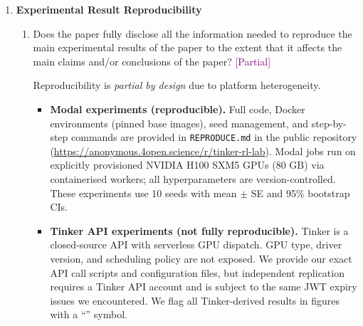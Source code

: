 \documentclass{article}
\newcommand{\answerPartial}[1][]{\textcolor{purple}{[Partial] #1}}
\begin{document}
\begin{enumerate}
\item {\bf Experimental Result Reproducibility}
    \begin{enumerate}
        \item Does the paper fully disclose all the information needed to
              reproduce the main experimental results of the paper to the
              extent that it affects the main claims and/or conclusions of
              the paper?
        \answerPartial{Reproducibility is \emph{partial by design} due to
        platform heterogeneity.
        \begin{itemize}
          \item \textbf{Modal experiments (reproducible).}  Full code,
                Docker environments (pinned base images), seed management,
                and step-by-step commands are provided in
                \texttt{REPRODUCE.md} in the public repository
                (\url{https://anonymous.4open.science/r/tinker-rl-lab}).
                Modal jobs run on explicitly provisioned NVIDIA H100 SXM5
                GPUs (80 GB) via containerised workers; all hyperparameters
                are version-controlled.  These experiments use 10 seeds with
                mean $\pm$ SE and 95\% bootstrap CIs.
          \item \textbf{Tinker API experiments (not fully reproducible).}
                Tinker is a closed-source API with serverless GPU dispatch.
                GPU type, driver version, and scheduling policy are not
                exposed.  We provide our exact API call scripts and
                configuration files, but independent replication requires a
                Tinker API account and is subject to the same JWT expiry
                issues we encountered.  We flag all Tinker-derived results
                in figures with a ``\dag{}'' symbol.
        \end{itemize}}
    \end{enumerate}


\end{enumerate}
\end{document}
